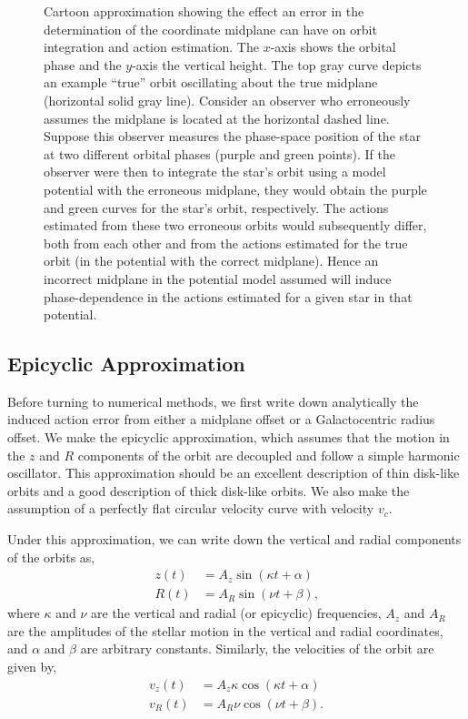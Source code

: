 \documentclass[twocolumn]{aastex62}
\newcommand{\beq}{\begin{equation}}
\newcommand{\eeq}{\end{equation}}
\begin{document}
\begin{figure}
\caption{Cartoon approximation showing the effect an error in the determination of the
coordinate midplane can have on orbit integration and action estimation. The
$x$-axis shows the orbital phase and the $y$-axis the vertical height. The top
gray curve depicts an example ``true'' orbit oscillating about the true
midplane (horizontal solid gray line). Consider an observer who erroneously
assumes the midplane is located at the horizontal dashed line. Suppose this
observer measures the phase-space position of the star at two different
orbital phases (purple and green points). If the observer were then to
integrate the star's orbit using a model potential with the erroneous
midplane, they would obtain the purple and green curves for the star's orbit,
respectively. The actions estimated from these two  erroneous orbits would
subsequently differ, both from each other and from the actions estimated for
the true orbit (in the potential with the correct midplane). Hence an
incorrect midplane in the potential model assumed will induce phase-dependence
in the actions estimated for a given star in that potential.}
\label{fig:cartoon}
\end{figure}

\subsection{Epicyclic Approximation} \label{ssec:epi_action}
Before turning to numerical methods, we first write down analytically the
induced action error from either a midplane offset or a Galactocentric radius
offset. We make the epicyclic approximation, which assumes that the motion in
the $z$ and $R$ components of the orbit are decoupled and follow a simple
harmonic oscillator. This approximation should be an excellent description of
thin disk-like orbits and a good description of thick disk-like orbits. We
also make the assumption of a perfectly flat circular velocity curve with
velocity $v_c$.

Under this approximation, we can write down the vertical and radial components
of the orbits as,
\beq\label{eq:orbits_epi}
\begin{split}
z(t) &= A_z \sin{(\kappa t + \alpha)}\\
R(t) &= A_R \sin{(\nu t + \beta)}\text{,}
\end{split}
\eeq
where $\kappa$ and $\nu$ are the vertical and radial (or epicyclic)
frequencies, $A_z$ and $A_R$ are the amplitudes of the stellar motion in the
vertical and radial coordinates, and $\alpha$ and $\beta$ are arbitrary
constants. Similarly, the velocities of the orbit are given by,
\beq\label{eq:orbits_vel_epi}
\begin{split}
v_z(t) &= A_z \kappa \cos{(\kappa t + \alpha)}\\
v_R(t) &= A_R \nu \cos{(\nu t + \beta)}\text{.}
\end{split}
\eeq
\end{document}
